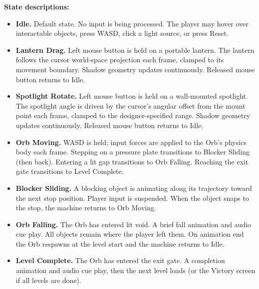 \documentclass[11pt, letterpaper]{article}
\begin{document}
        \medskip\noindent\textbf{State descriptions:}
        \begin{itemize}[leftmargin=1.5em, itemsep=2pt]
            \item \textbf{Idle.} Default state. No input is being processed.
                  The player may hover over interactable objects, press WASD,
                  click a light source, or press Reset.
            \item \textbf{Lantern Drag.} Left mouse button is held on a
                  portable lantern. The lantern follows the cursor world-space
                  projection each frame, clamped to its movement boundary.
                  Shadow geometry updates continuously. Released mouse button
                  returns to Idle.
            \item \textbf{Spotlight Rotate.} Left mouse button is held on a
                  wall-mounted spotlight. The spotlight angle is driven by the
                  cursor's angular offset from the mount point each frame,
                  clamped to the designer-specified range. Shadow geometry
                  updates continuously. Released mouse button returns to Idle.
            \item \textbf{Orb Moving.} WASD is held; input forces are applied
                  to the Orb's physics body each frame. Stepping on a pressure
                  plate transitions to Blocker Sliding (then back). Entering
                  a lit gap transitions to Orb Falling. Reaching the exit gate
                  transitions to Level Complete.
            \item \textbf{Blocker Sliding.} A blocking object is animating
                  along its trajectory toward the next stop position. Player
                  input is suspended. When the object snaps to the stop, the
                  machine returns to Orb Moving.
            \item \textbf{Orb Falling.} The Orb has entered lit void. A brief
                  fall animation and audio cue play. All objects remain where
                  the player left them. On animation end the Orb respawns at
                  the level start and the machine returns to Idle.
            \item \textbf{Level Complete.} The Orb has entered the exit gate.
                  A completion animation and audio cue play, then the next
                  level loads (or the Victory screen if all levels are done).
        \end{itemize}
\end{document}

